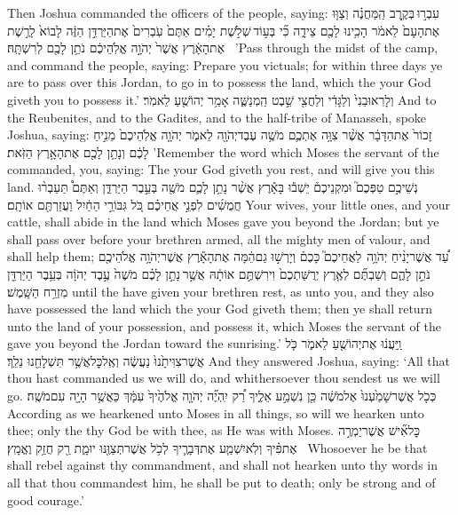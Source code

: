 {Then Joshua commanded the officers of the people, saying:}
{עִבְר֣וּ \legarmeh  בְּקֶ֣רֶב הַֽמַּחֲנֶ֗ה וְצַוּ֤וּ אֶת\maqqaf הָעָם֙ לֵאמֹ֔ר הָכִ֥ינוּ לָכֶ֖ם צֵידָ֑ה כִּ֞י בְּע֣וֹד \legarmeh  שְׁלֹ֣שֶׁת יָמִ֗ים אַתֶּם֙ עֹֽבְרִים֙ אֶת\maqqaf הַיַּרְדֵּ֣ן הַזֶּ֔ה לָבוֹא֙ לָרֶ֣שֶׁת אֶת\maqqaf הָאָ֔רֶץ אֲשֶׁר֙ יְהֹוָ֣ה אֱלֹֽהֵיכֶ֔ם נֹתֵ֥ן לָכֶ֖ם לְרִשְׁתָּֽהּ׃ \petucha }
{’Pass through the midst of the camp, and command the people, saying: Prepare you victuals; for within three days ye are to pass over this Jordan, to go in to possess the land, which the \lord\space your God giveth you to possess it.’}
{וְלָרֽאוּבֵנִי֙ וְלַגָּדִ֔י וְלַחֲצִ֖י שֵׁ֣בֶט הַֽמְנַשֶּׁ֑ה אָמַ֥ר יְהוֹשֻׁ֖עַ לֵאמֹֽר׃}
{And to the Reubenites, and to the Gadites, and to the half-tribe of Manasseh, spoke Joshua, saying:}
{זָכוֹר֙ אֶת\maqqaf הַדָּבָ֔ר אֲשֶׁ֨ר צִוָּ֥ה אֶתְכֶ֛ם מֹשֶׁ֥ה עֶבֶד\maqqaf יְהֹוָ֖ה לֵאמֹ֑ר יְהֹוָ֤ה אֱלֹֽהֵיכֶם֙ מֵנִ֣יחַ לָכֶ֔ם וְנָתַ֥ן לָכֶ֖ם אֶת\maqqaf הָאָ֥רֶץ הַזֹּֽאת׃}
{’Remember the word which Moses the servant of the \lord\space commanded, you, saying: The \lord\space your God giveth you rest, and will give you this land.}
{נְשֵׁיכֶ֣ם טַפְּכֶם֮ וּמִקְנֵיכֶם֒ יֵשְׁב֕וּ בָּאָ֕רֶץ אֲשֶׁ֨ר נָתַ֥ן לָכֶ֛ם מֹשֶׁ֖ה בְּעֵ֣בֶר הַיַּרְדֵּ֑ן וְאַתֶּם֩ תַּעַבְר֨וּ חֲמֻשִׁ֜ים לִפְנֵ֣י אֲחֵיכֶ֗ם כֹּ֚ל גִּבּוֹרֵ֣י הַחַ֔יִל וַעֲזַרְתֶּ֖ם אוֹתָֽם׃}
{Your wives, your little ones, and your cattle, shall abide in the land which Moses gave you beyond the Jordan; but ye shall pass over before your brethren armed, all the mighty men of valour, and shall help them;}
{עַ֠ד אֲשֶׁר\maqqaf יָנִ֨יחַ יְהֹוָ֥ה \pasek  לַאֲחֵיכֶם֮ כָּכֶם֒ וְיָרְשׁ֣וּ גַם\maqqaf הֵ֔מָּה אֶת\maqqaf הָאָ֕רֶץ אֲשֶׁר\maqqaf יְהֹוָ֥ה אֱלֹהֵיכֶ֖ם נֹתֵ֣ן לָהֶ֑ם וְשַׁבְתֶּ֞ם לְאֶ֤רֶץ יְרֻשַּׁתְכֶם֙ וִירִשְׁתֶּ֣ם אוֹתָ֔הּ אֲשֶׁ֣ר \legarmeh  נָתַ֣ן לָכֶ֗ם מֹשֶׁה֙ עֶ֣בֶד יְהֹוָ֔ה בְּעֵ֥בֶר הַיַּרְדֵּ֖ן מִזְרַ֥ח הַשָּֽׁמֶשׁ׃}
{until the \lord\space have given your brethren rest, as unto you, and they also have possessed the land which the \lord\space your God giveth them; then ye shall return unto the land of your possession, and possess it, which Moses the servant of the \lord\space gave you beyond the Jordan toward the sunrising.’}
{וַֽיַּעֲנ֔וּ אֶת\maqqaf יְהוֹשֻׁ֖עַ לֵאמֹ֑ר כֹּ֤ל אֲשֶׁר\maqqaf צִוִּיתָ֙נוּ֙ נַעֲשֶׂ֔ה וְאֶֽל\maqqaf כׇּל\maqqaf אֲשֶׁ֥ר תִּשְׁלָחֵ֖נוּ נֵלֵֽךְ׃}
{And they answered Joshua, saying: ‘All that thou hast commanded us we will do, and whithersoever thou sendest us we will go.}
{כְּכֹ֤ל אֲשֶׁר\maqqaf שָׁמַ֙עְנוּ֙ אֶל\maqqaf מֹשֶׁ֔ה כֵּ֖ן נִשְׁמַ֣ע אֵלֶ֑יךָ רַ֠ק יִֽהְיֶ֞ה יְהֹוָ֤ה אֱלֹהֶ֙יךָ֙ עִמָּ֔ךְ כַּאֲשֶׁ֥ר הָיָ֖ה עִם\maqqaf מֹשֶֽׁה׃}
{According as we hearkened unto Moses in all things, so will we hearken unto thee; only the \lord\space thy God be with thee, as He was with Moses.}
{כׇּל\maqqaf אִ֞ישׁ אֲשֶׁר\maqqaf יַמְרֶ֣ה אֶת\maqqaf פִּ֗יךָ וְלֹֽא\maqqaf יִשְׁמַ֧ע אֶת\maqqaf דְּבָרֶ֛יךָ לְכֹ֥ל אֲשֶׁר\maqqaf תְּצַוֶּ֖נּוּ יוּמָ֑ת רַ֖ק חֲזַ֥ק וֶאֱמָֽץ׃ \petucha }
{Whosoever he be that shall rebel against thy commandment, and shall not hearken unto thy words in all that thou commandest him, he shall be put to death; only be strong and of good courage.’}
